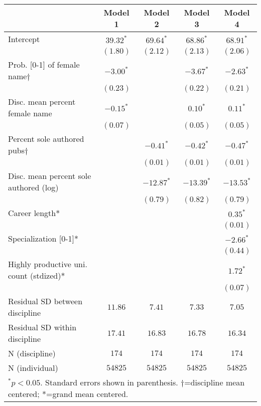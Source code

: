\documentclass[
  10pt,
  letterpaper,
]{article}
\begin{document}
\begin{table}
{\begin{tabular}{l c c c c}
\hline
 & Model 1 & Model 2 & Model 3 & Model 4 \\
\hline
Intercept                               & $39.32^{*}$ & $69.64^{*}$  & $68.86^{*}$  & $68.91^{*}$  \\
                                        & $(1.80)$    & $(2.12)$     & $(2.13)$     & $(2.06)$     \\
Prob. [0-1] of female name$\dagger$     & $-3.00^{*}$ &              & $-3.67^{*}$  & $-2.63^{*}$  \\
                                        & $(0.23)$    &              & $(0.22)$     & $(0.21)$     \\
Disc. mean percent female name          & $-0.15^{*}$ &              & $0.10^{*}$   & $0.11^{*}$   \\
                                        & $(0.07)$    &              & $(0.05)$     & $(0.05)$     \\
Percent sole authored pubs$\dagger$     &             & $-0.41^{*}$  & $-0.42^{*}$  & $-0.47^{*}$  \\
                                        &             & $(0.01)$     & $(0.01)$     & $(0.01)$     \\
Disc. mean percent sole authored (log)  &             & $-12.87^{*}$ & $-13.39^{*}$ & $-13.53^{*}$ \\
                                        &             & $(0.79)$     & $(0.82)$     & $(0.79)$     \\
Career length*                          &             &              &              & $0.35^{*}$   \\
                                        &             &              &              & $(0.01)$     \\
Specialization [0-1]*                   &             &              &              & $-2.66^{*}$  \\
                                        &             &              &              & $(0.44)$     \\
Highly productive uni. count (stdized)* &             &              &              & $1.72^{*}$   \\
                                        &             &              &              & $(0.07)$     \\
\hline
Residual SD between discipline          & $11.86$     & $7.41$       & $7.33$       & $7.05$       \\
Residual SD within discipline           & $17.41$     & $16.83$      & $16.78$      & $16.34$      \\
N (discipline)                          & $174$       & $174$        & $174$        & $174$        \\
N (individual)                          & $54825$     & $54825$      & $54825$      & $54825$      \\
\hline
\multicolumn{5}{l}{\scriptsize{$^{*}p<0.05$. Standard errors shown in parenthesis. $\dagger$=discipline mean centered; *=grand mean centered.}}
\end{tabular}

}
\end{table}
\end{document}
